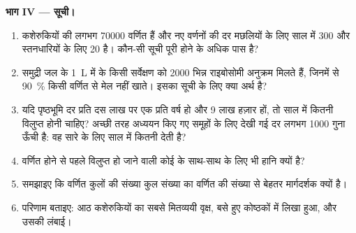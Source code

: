 \begin{problem}
\medskip
\noindent\textbf{भाग IV --- सूची।}
\begin{enumerate}[resume]
  \item कशेरुकियों की लगभग \num{70000}  वर्णित हैं और नए वर्णनों
        की दर मछलियों के लिए साल में \num{300} और स्तनधारियों के लिए
        \num{20} है। कौन-सी सूची पूरी होने के अधिक पास है?
  \item समुद्री जल के \qty{1}{L} में  के किसी सर्वेक्षण को
        \num{2000} भिन्न राइबोसोमी अनुक्रम मिलते हैं, जिनमें से
        \qty{90}{\%} किसी वर्णित  से मेल नहीं खाते। इसका
         सूची के लिए क्या अर्थ है?
  \item यदि पृष्ठभूमि  दर प्रति दस लाख पर एक  प्रति वर्ष हो
        और   \num{9} लाख हज़ार हों, तो साल में कितनी
        विलुप्त होनी चाहिए? अच्छी तरह अध्ययन किए गए समूहों के लिए देखी
        गई दर लगभग \num{1000} गुना ऊँची है: वह सारे  के
        लिए साल में कितनी देती है?
  \item वर्णित होने से पहले विलुप्त हो जाने वाली कोई   के
        साथ-साथ  के लिए भी हानि क्यों है?
  \item समझाइए कि वर्णित कुलों की संख्या कुल संख्या का वर्णित  की
        संख्या से बेहतर मार्गदर्शक क्यों है।
  \item परिणाम बताइए: आठ कशेरुकियों का सबसे मितव्ययी वृक्ष, बसे हुए
        कोष्ठकों में लिखा हुआ, और उसकी लंबाई।
\end{enumerate}
\end{problem}
